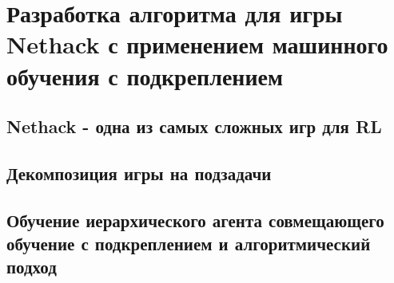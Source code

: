 \chapter{Разработка алгоритма для игры Nethack с применением машинного обучения с подкреплением}\label{ch:ch3}

\section{Nethack - одна из самых сложных игр для RL}
\section{Декомпозиция игры на подзадачи}
\section{Обучение иерархического агента совмещающего обучение с подкреплением и алгоритмический подход}


\clearpage
